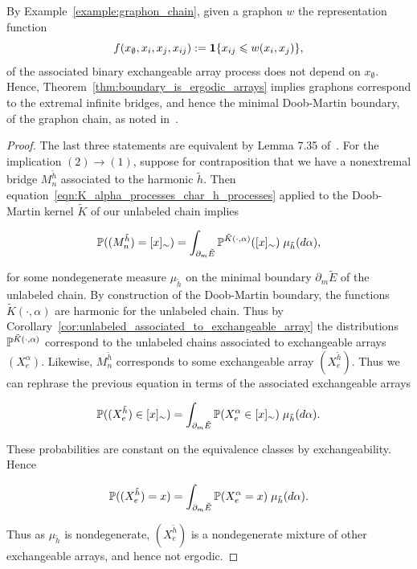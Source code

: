 %
\begin{remark}
    By Example~\ref{example:graphon_chain}, given a graphon $w$ the representation function
        \[f(x_\emptyset, x_i,x_j,x_{ij}) := \ind \{x_{ij} \leq w(x_i,x_j)\},\]
    \noindent of the associated binary exchangeable array process does not depend on $x_\emptyset$.
    Hence, Theorem~\ref{thm:boundary_is_ergodic_arrays} implies
    graphons correspond to the extremal infinite bridges, and hence the minimal
    Doob-Martin boundary, of the graphon chain, as noted in~\cite{grubel2015_persisting_randomness_graphs_search_trees}.
\end{remark}

\begin{proof}
The last three statements are equivalent by Lemma 7.35 of~\cite{kallenberg2005_probabilistic_symmetries}. For the implication $(2) \to (1)$, suppose for contraposition that we have a nonextremal bridge $M_n^{\tilde{h}}$ associated to the harmonic $\tilde{h}$. Then equation~\eqref{eqn:K_alpha_processes_char_h_processes} applied to the Doob-Martin kernel $\tilde{K}$ of our unlabeled chain implies

\[\P((M_n^{\tilde{h}}) = [x]_\sim) = \int_{\partial_m \tilde{E}} \P^{\tilde{K}(\cdot, \alpha)}([x]_\sim) \; \mu_{\tilde{h}}(d\alpha),\]

\noindent for some nondegenerate measure $\mu_{\tilde{h}}$ on the minimal boundary $\partial_m \tilde{E}$ of the unlabeled chain. By construction of the Doob-Martin boundary, the functions $\tilde{K}(\cdot, \alpha)$ are harmonic for the unlabeled chain. Thus by Corollary~\ref{cor:unlabeled_associated_to_exchangeable_array} the distributions $\P^{\tilde{K}(\cdot, \alpha)}$ correspond to the unlabeled chains associated to exchangeable arrays $(X^\alpha_e)$. Likewise, $M_n^{\tilde{h}}$ corresponds to some exchangeable array $(X_e^{\tilde{h}})$. Thus we can rephrase the previous equation in terms of the associated exchangeable arrays

\[\P((X^{\tilde{h}}_e) \in [x]_\sim) = \int_{\partial_m \tilde{E}} \P(X_e^\alpha \in [x]_\sim) \; \mu_{\tilde{h}}(d\alpha).\]

\noindent These probabilities are constant on the equivalence classes by exchangeability. Hence

\[\P((X^{\tilde{h}}_e) = x) = \int_{\partial_m \tilde{E}} \P(X_e^\alpha = x) \; \mu_{\tilde{h}}(d\alpha).\]

\noindent Thus as $\mu_{\tilde{h}}$ is nondegenerate, $(X_e^{\tilde{h}})$ is a nondegenerate mixture of other exchangeable arrays, and hence not ergodic.


\end{proof}
